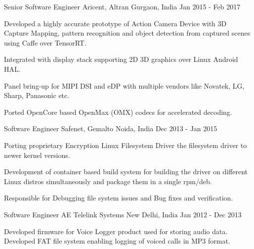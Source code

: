 \begin{cventries}
  \cventry
    {Senior Software Engineer}
    {Aricent, Altran}
    {Gurgaon, India}
    {Jan 2015 - Feb 2017}
    {
      \begin{cvitems}
        \item {Developed a highly accurate prototype of Action Camera Device with 3D Capture Mapping, pattern recognition and object detection from captured scenes using Caffe over TensorRT.}
        \item {Integrated with display stack supporting 2D 3D graphics over Linux Android HAL.}
        \item {Panel bring-up for MIPI DSI and eDP with multiple vendors like Novatek, LG, Sharp, Panasonic etc.}
        \item {Ported OpenCore based OpenMax (OMX) codecs for accelerated decoding.}
      \end{cvitems}
    }	  
	  
  \cventry
    {Software Engineer}
    {Safenet, Gemalto}
    {Noida, India}
    {Dec 2013 - Jan 2015}
    {
      \begin{cvitems}
        \item {Porting proprietary Encryption Linux Filesystem Driver the filesystem driver to newer kernel versions.}
        \item {Development of container based build system for building the driver on different Linux distros simultaneously and package them in a single rpm/deb.}
        \item {Responsible for Debugging file system issues and Bug fixes and verification.}
      \end{cvitems}
    }	  
	  
  \cventry
    {Software Engineer}
    {AE Telelink Systems}
    {New Delhi, India}
    {Jan 2012 - Dec 2013}
    {
      \begin{cvitems}
        \item {Developed firmware for Voice Logger product used for storing audio data. Developed FAT file system enabling logging of voiced calls in MP3 format.}
      \end{cvitems}
    }  
\end{cventries}
